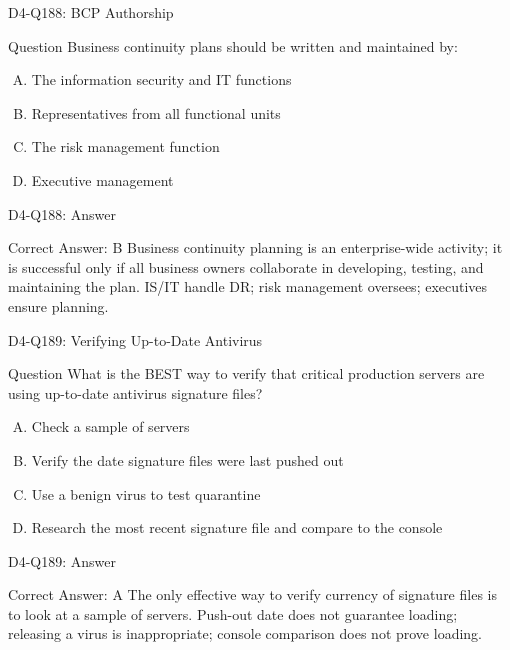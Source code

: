 \documentclass{beamer}
\begin{document}
	\begin{frame}{D4-Q188: BCP Authorship}
		\begin{block}{Question}
			Business continuity plans should be written and maintained by:
		\end{block}
		\begin{enumerate}[(A)]
			\item The information security and IT functions
			\item Representatives from all functional units
			\item The risk management function
			\item Executive management
		\end{enumerate}
	\end{frame}
	\begin{frame}{D4-Q188: Answer}
		\begin{block}{Correct Answer: B}
			Business continuity planning is an enterprise-wide activity; it is successful only if all business owners collaborate in developing, testing, and maintaining the plan. IS/IT handle DR; risk management oversees; executives ensure planning.
		\end{block}
	\end{frame}
	
	\begin{frame}{D4-Q189: Verifying Up-to-Date Antivirus}
		\begin{block}{Question}
			What is the BEST way to verify that critical production servers are using up-to-date antivirus signature files?
		\end{block}
		\begin{enumerate}[(A)]
			\item Check a sample of servers
			\item Verify the date signature files were last pushed out
			\item Use a benign virus to test quarantine
			\item Research the most recent signature file and compare to the console
		\end{enumerate}
	\end{frame}
	\begin{frame}{D4-Q189: Answer}
		\begin{block}{Correct Answer: A}
			The only effective way to verify currency of signature files is to look at a sample of servers. Push-out date does not guarantee loading; releasing a virus is inappropriate; console comparison does not prove loading.
		\end{block}
	\end{frame}
	
\end{document}
